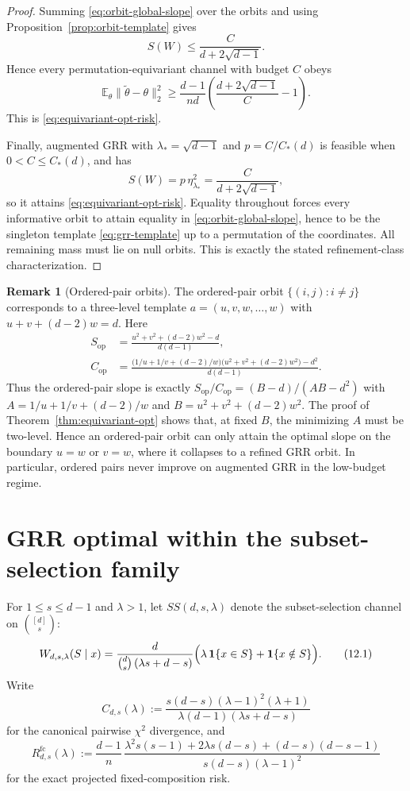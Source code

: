 \documentclass[11pt]{amsart}
\numberwithin{equation}{section}
\theoremstyle{definition}
\newtheorem{remark}[theorem]{Remark}
\newcommand{\E}{\mathbb E}
\newcommand{\one}{\mathbf 1}
\begin{document}
\begin{proof}
Summing \eqref{eq:orbit-global-slope} over the orbits and using Proposition~\ref{prop:orbit-template} gives
\[
S(W)\le \frac{C}{d+2\sqrt{d-1}}.
\]
Hence every permutation-equivariant channel with budget \(C\) obeys
\[
\E_\theta\|\widetilde\theta-\theta\|_2^2
\ge
\frac{d-1}{nd}\left(\frac{d+2\sqrt{d-1}}{C}-1\right).
\]
This is \eqref{eq:equivariant-opt-risk}.

Finally, augmented GRR with \(\lambda_\ast=\sqrt{d-1}\) and \(p=C/C_\ast(d)\) is feasible when
\(0<C\le C_\ast(d)\), and has
\[
S(W)
=
p\,\eta_{\lambda_\ast}^2
=
\frac{C}{d+2\sqrt{d-1}},
\]
so it attains \eqref{eq:equivariant-opt-risk}.
Equality throughout forces every informative orbit to attain equality in
\eqref{eq:orbit-global-slope}, hence to be the singleton template \eqref{eq:grr-template} up to a
permutation of the coordinates.
All remaining mass must lie on null orbits.
This is exactly the stated refinement-class characterization.
\end{proof}

\begin{remark}[Ordered-pair orbits]\label{rem:ordered-pairs}
The ordered-pair orbit \(\{(i,j):i\neq j\}\) corresponds to a three-level template
\(
a=(u,v,w,\dots,w)
\)
with \(u+v+(d-2)w=d\).
Here
\[
\begin{aligned}
S_{\mathrm{op}}
&=
\frac{u^2+v^2+(d-2)w^2-d}{d(d-1)},\\
C_{\mathrm{op}}
&=
\frac{\bigl(1/u+1/v+(d-2)/w\bigr)\bigl(u^2+v^2+(d-2)w^2\bigr)-d^2}{d(d-1)}.
\end{aligned}
\]
Thus the ordered-pair slope is exactly \(S_{\mathrm{op}}/C_{\mathrm{op}}=(B-d)/(AB-d^2)\) with
\(A=1/u+1/v+(d-2)/w\) and \(B=u^2+v^2+(d-2)w^2\).
The proof of Theorem~\ref{thm:equivariant-opt} shows that, at fixed \(B\), the minimizing \(A\) must be
two-level.
Hence an ordered-pair orbit can only attain the optimal slope on the boundary \(u=w\) or \(v=w\),
where it collapses to a refined GRR orbit.
In particular, ordered pairs never improve on augmented GRR in the low-budget regime.
\end{remark}

\section{GRR optimal within the subset-selection family}\label{sec:ss}

For \(1\le s\le d-1\) and \(\lambda>1\), let \(SS(d,s,\lambda)\) denote the subset-selection channel on
\(\binom{[d]}{s}\):
\[
W_{d,s,\lambda}(S\mid x)
=
\frac{d}{\binom ds\,(\lambda s+d-s)}
\Bigl(\lambda\,\one\{x\in S\}+\one\{x\notin S\}\Bigr). \tag{12.1}\label{eq:ss-kernel}
\]
Write
\[
C_{d,s}(\lambda)
:=
\frac{s(d-s)(\lambda-1)^2(\lambda+1)}
{\lambda(d-1)(\lambda s+d-s)} \tag{12.2}\label{eq:ss-budget}
\]
for the canonical pairwise \(\chi^2\) divergence, and
\[
R^{\mathrm{fc}}_{d,s}(\lambda)
:=
\frac{d-1}{n}\,
\frac{\lambda^2s(s-1)+2\lambda s(d-s)+(d-s)(d-s-1)}
{s(d-s)(\lambda-1)^2} \tag{12.3}\label{eq:ss-risk}
\]
for the exact projected fixed-composition risk.
\end{document}
